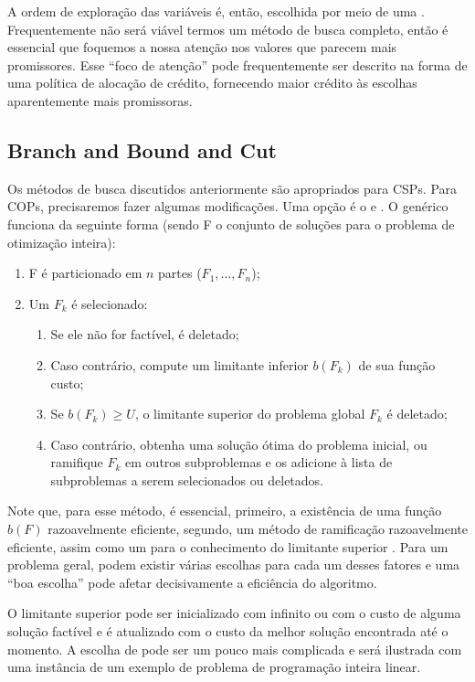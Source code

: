 \documentclass{article}
\begin{document}
A ordem de exploração das variáveis é, então, escolhida por meio de uma . Frequentemente não será viável termos um método de busca completo, então é
essencial que foquemos a nossa atenção nos valores que parecem mais promissores. Esse ``foco de
atenção'' pode frequentemente ser descrito na forma de uma política de alocação de crédito,
fornecendo maior crédito às escolhas aparentemente mais promissoras.

\subsection{Branch and Bound and Cut}

Os métodos de busca discutidos anteriormente são apropriados para CSPs. Para COPs, precisaremos
fazer algumas modificações. Uma opção é o  e . O  genérico funciona da seguinte forma (sendo F o conjunto de
soluções para o problema de otimização inteira):

\begin{enumerate}
  \item F é particionado em $n$ partes ($F_1, \hdots, F_n$);
  \item Um $F_k$ é selecionado:
    \begin{enumerate}
      \item Se ele não for factível, é deletado;
      \item Caso contrário, compute um limitante inferior $b(F_k)$ de sua função custo;
      \item Se $b(F_k) \geq U$, o limitante superior do problema global $F_k$ é deletado;
      \item Caso contrário, obtenha uma solução ótima do problema inicial, ou ramifique $F_k$ em
        outros subproblemas e os adicione à lista de subproblemas a serem selecionados ou deletados.
    \end{enumerate}
  \end{enumerate}

Note que, para esse método, é essencial, primeiro, a existência de uma função $b(F)$ razoavelmente
eficiente, segundo, um método de ramificação razoavelmente eficiente, assim como um para o
conhecimento do limitante superior . Para um problema geral, podem existir várias
escolhas para cada um desses fatores e uma ``boa escolha'' pode afetar decisivamente a eficiência
do algoritmo.

O limitante superior  pode ser inicializado com infinito ou com o custo de alguma
solução factível e é atualizado com o custo da melhor solução encontrada até o momento. A escolha de
 pode ser um pouco mais complicada e será ilustrada com uma instância de um exemplo de
problema de programação inteira linear.
\end{document}
